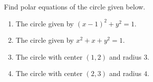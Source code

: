 Find polar equations of the circle given below.

\begin{enumerate}
\item The circle given by $(x-1)^2+y^2=1$.
\item The circle given by $x^2+ x+y^2=1$.
\item The circle with center $(1,2)$ and radius $3$.
\item The circle with center $(2,3)$ and radius $4$.
\end{enumerate}